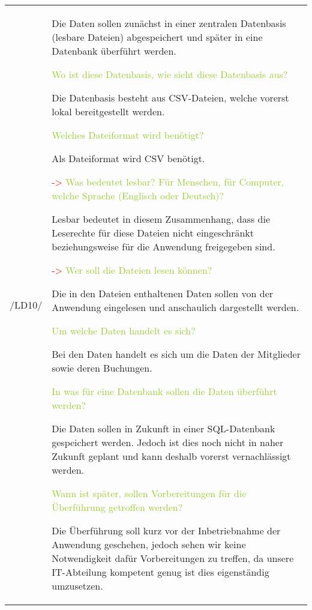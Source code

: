 \begin{center}
    \begin{tabular}[ht] {l | p{13cm}}
        \hline
        /LD10/ & Die Daten sollen zunächst in einer zentralen Datenbasis (lesbare Dateien) abgespeichert und später in eine Datenbank überführt werden. 
        
        \textcolor{YellowGreen}{Wo ist diese Datenbasis, wie sieht diese Datenbasis aus?}
        
        \textcolor{NavyBlue}{Die Datenbasis besteht aus CSV-Dateien, welche vorerst lokal bereitgestellt werden.}


        \textcolor{YellowGreen}{Welches Dateiformat wird benötigt?}

        \textcolor{NavyBlue}{Als Dateiformat wird CSV benötigt.}

        \textcolor{Red}{->}
        \textcolor{YellowGreen}{Was bedeutet lesbar? Für Menschen, für Computer, welche Sprache (Englisch oder Deutsch)?}

        \textcolor{NavyBlue}{Lesbar bedeutet in diesem Zusammenhang, dass die Leserechte für diese Dateien nicht eingeschränkt beziehungsweise für die Anwendung freigegeben sind.}

        \textcolor{Red}{->}
        \textcolor{YellowGreen}{Wer soll die Dateien lesen können?}
        
        \textcolor{NavyBlue}{Die in den Dateien enthaltenen Daten sollen von der Anwendung eingelesen und anschaulich dargestellt werden.}


        \textcolor{YellowGreen}{Um welche Daten handelt es sich?}

        \textcolor{NavyBlue}{Bei den Daten handelt es sich um die Daten der Mitglieder sowie deren Buchungen.}


        \textcolor{YellowGreen}{In was für eine Datenbank sollen die Daten überführt werden?}

        \textcolor{NavyBlue}{Die Daten sollen in Zukunft in einer SQL-Datenbank gespeichert werden. Jedoch ist dies noch nicht in naher Zukunft geplant und kann deshalb vorerst vernachlässigt werden.}

        \textcolor{YellowGreen}{Wann ist später, sollen Vorbereitungen für die Überführung getroffen werden?}

        \textcolor{NavyBlue}{Die Überführung soll kurz vor der Inbetriebnahme der Anwendung geschehen, jedoch sehen wir keine Notwendigkeit dafür Vorbereitungen zu treffen, da unsere IT-Abteilung kompetent genug ist dies eigenständig umzusetzen.}


\end{tabular}
\end{center}
